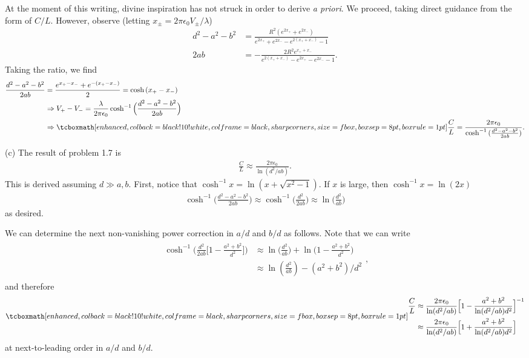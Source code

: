 {At the moment of this writing, divine inspiration has not struck in order to derive  \textit{a priori}.
We proceed, taking direct guidance from the form of $C/L$.
However, observe (letting $x_{\pm} = 2 \pi \epsilon_0 V_{\pm} / \lambda$)
\begin{align}
    d^2 - a^2 - b^2 &= \frac{R^2 (e^{2x_{+}} + e^{2 x_{-}})}{e^{2x_{+}} + e^{2x_{-}} - e^{2(x_{+}+x_{-})} - 1} \\
    2ab &= -\frac{2 R^2 e^{x_{+} + x_{-}}}{e^{2(x_{+} + x_{-})} - e^{2x_{+}} - e^{2x_{-}} - 1}
.\end{align}
Taking the ratio, we find
\begin{eqnarray}
    \begin{aligned}
        \frac{d^2 - a^2 - b^2}{2ab} &= \frac{e^{x_{+} - x_{-}} + e^{-(x_{+} - x_{-})}}{2} = \cosh{(x_{+} - x_{-})} \\
                                    &\Rightarrow V_{+} - V_{-} = \frac{\lambda}{2 \pi \epsilon_0} \cosh^{-1}{\Big( \frac{d^2 - a^2 - b^2}{2ab} \Big)} \\
                                    &\Rightarrow \eqbox{ \frac{C}{L} = \frac{2 \pi \epsilon_0}{\cosh^{-1}{(\frac{d^2 - a^2 - b^2}{2 a b})}} }
    .\end{aligned}
\end{eqnarray}

(c) The result of problem 1.7 is
\begin{eqnarray}
    \frac{C}{L} \approx \frac{2\pi \epsilon_0}{\ln(d^2/ab)}
.\end{eqnarray}
This is derived assuming $d \gg a,b$.
First, notice that $\cosh^{-1}{x} = \ln{(x + \sqrt{x^2 - 1})}$.
If $x$ is large, then $\cosh^{-1}{x} = \ln{(2x)}$
\begin{eqnarray}
    \cosh^{-1}{\Big( \frac{d^2 - a^2 - b^2}{2ab} \Big)} \approx \cosh^{-1}{\Big( \frac{d^2}{2ab} \Big)} \approx \ln{\Big( \frac{d^2}{ab} \Big)}
\end{eqnarray}
as desired.

We can determine the next non-vanishing power correction in $a/d$ and $b/d$ as follows.
Note that we can write
\begin{eqnarray}
    \begin{aligned}
        \cosh^{-1}{\Big( \frac{d^2}{2ab} \Big[ 1 - \frac{a^2 + b^2}{d^2} \Big] \Big)} &\approx \ln{\Big( \frac{d^2}{ab} \Big)} + \ln{\Big( 1 - \frac{a^2 + b^2}{d^2} \Big)} \\
                                                                                      &\approx \ln(\frac{d^2}{ab}) - (a^2 + b^2)/d^2
    \end{aligned}
,\end{eqnarray}
and therefore
\begin{eqnarray}
    \eqbox{
    \begin{aligned}
        \frac{C}{L} &\approx \frac{2 \pi \epsilon_0}{\ln(d^2/ab)} \Big[ 1 - \frac{a^2 + b^2}{ \ln(d^2/ab) d^2} \Big]^{-1} \\
                    &\approx \frac{2 \pi \epsilon_0}{\ln(d^2/ab)} \Big[ 1 + \frac{a^2 + b^2}{\ln(d^2/ab) d^2} \Big]
    \end{aligned}
}
\end{eqnarray}
at next-to-leading order in $a/d$ and $b/d$.

}
